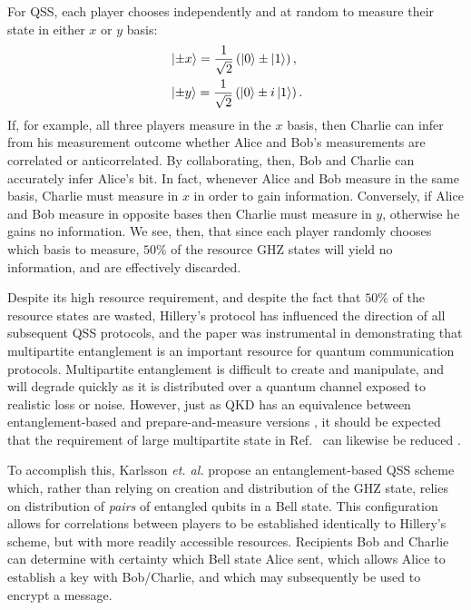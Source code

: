 For QSS, each player chooses independently and at random to measure their state in either $x$ or $y$ basis:
\begin{align}
&\ket{\pm x} = \frac{1}{\sqrt{2}} \left( \ket{0} \pm \ket{1}\right), \notag \\
%
&\ket{\pm y} = \frac{1}{\sqrt{2}} \left( \ket{0} \pm i \ket{1} \right). \notag
\end{align}
If, for example, all three players measure in the $x$ basis, then Charlie can infer from his measurement outcome whether Alice and Bob's measurements are correlated or anticorrelated. By collaborating, then, Bob and Charlie can accurately infer Alice's bit. In fact, whenever Alice and Bob measure in the same basis, Charlie must measure in $x$ in order to gain information. Conversely, if Alice and Bob measure in opposite bases then Charlie must measure in $y$, otherwise he gains no information. We see, then, that since each player randomly chooses which basis to measure, $50\%$ of the resource GHZ states will yield no information, and are effectively discarded.

Despite its high resource requirement, and despite the fact that $50\%$ of the resource states are wasted, Hillery's protocol has influenced the direction of all subsequent QSS protocols, and the paper was instrumental in demonstrating that multipartite entanglement is an important resource for quantum communication protocols. 
Multipartite entanglement is difficult to create and manipulate, and will degrade quickly as it is distributed over a quantum channel exposed to realistic loss or noise. However, just as QKD has an equivalence between entanglement-based and prepare-and-measure versions \cite{Grosshans2003, Laudenbach2017}, it should be expected that the requirement of large multipartite state in Ref.~\cite{Hillery1999} can likewise be reduced \cite{Karlsson1999, Tittel2001, Zhang2005b, Williams2019}. 

To accomplish this, Karlsson \emph{et. al.} \cite{Karlsson1999} propose an entanglement-based QSS scheme which, rather than relying on creation and distribution of the GHZ state, relies on distribution of \emph{pairs} of entangled qubits in a Bell state. This configuration allows for correlations between players to be established identically to Hillery's scheme, but with more readily accessible resources. Recipients Bob and Charlie can determine with certainty which Bell state Alice sent, which allows Alice to establish a key with Bob/Charlie, and which may subsequently be used to encrypt a message. %

